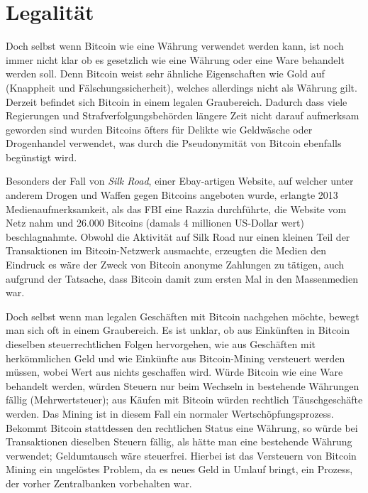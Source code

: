 \section{Legalität}

Doch selbst wenn Bitcoin wie eine Währung verwendet werden kann, ist noch immer nicht klar ob es gesetzlich wie eine Währung oder eine Ware behandelt werden soll.
Denn Bitcoin weist sehr ähnliche Eigenschaften wie Gold auf (Knappheit und Fälschungssicherheit), welches allerdings nicht als Währung gilt.
Derzeit befindet sich Bitcoin in einem legalen Graubereich.
Dadurch dass viele Regierungen und Strafverfolgungsbehörden längere Zeit nicht darauf aufmerksam geworden sind wurden Bitcoins öfters für Delikte wie Geldwäsche  oder Drogenhandel  verwendet, was durch die Pseudonymität von Bitcoin ebenfalls begünstigt wird.

Besonders der Fall von \emph{Silk Road}, einer Ebay-artigen Website, auf welcher unter anderem Drogen und Waffen gegen Bitcoins angeboten wurde, erlangte 2013 Medienaufmerksamkeit, als das FBI eine Razzia durchführte, die Website vom Netz nahm und 26.000 Bitcoins (damals 4 millionen US-Dollar wert) beschlagnahmte.
Obwohl die Aktivität auf Silk Road nur einen kleinen Teil der Transaktionen im Bitcoin-Netzwerk ausmachte, erzeugten die Medien den Eindruck es wäre der Zweck von Bitcoin anonyme Zahlungen zu tätigen, auch aufgrund der Tatsache, dass Bitcoin damit zum ersten Mal in den Massenmedien war.

Doch selbst wenn man legalen Geschäften mit Bitcoin nachgehen möchte, bewegt man sich oft in einem Graubereich.
Es ist unklar, ob aus Einkünften in Bitcoin dieselben steuerrechtlichen Folgen hervorgehen, wie aus Geschäften mit herkömmlichen Geld und wie Einkünfte aus Bitcoin-Mining versteuert werden müssen, wobei Wert aus nichts geschaffen wird.
Würde Bitcoin wie eine Ware behandelt werden, würden Steuern nur beim Wechseln in bestehende Währungen fällig (Mehrwertsteuer); aus Käufen mit Bitcoin würden rechtlich Täuschgeschäfte werden.
Das Mining ist in diesem Fall ein normaler Wertschöpfungsprozess.
Bekommt Bitcoin stattdessen den rechtlichen Status eine Währung, so würde bei Transaktionen dieselben Steuern fällig, als hätte man eine bestehende Währung verwendet; Geldumtausch wäre steuerfrei.
Hierbei ist das Versteuern von Bitcoin Mining ein ungelöstes Problem, da es neues Geld in Umlauf bringt, ein Prozess, der vorher Zentralbanken vorbehalten war.
